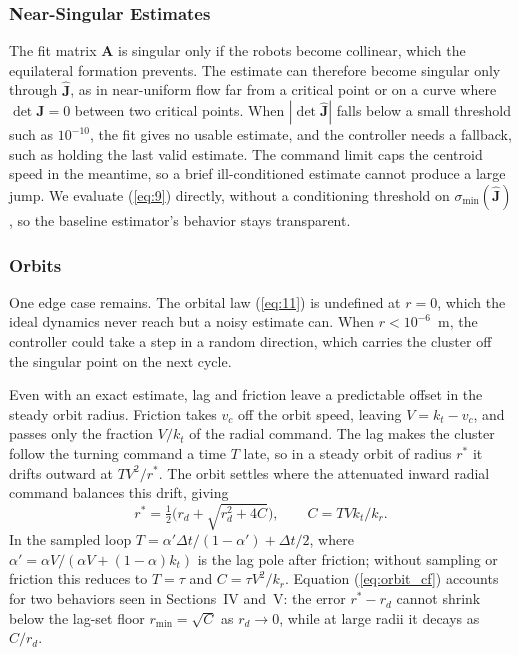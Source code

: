 \documentclass[lettersize,journal]{IEEEtran}
\begin{document}
\subsubsection{Near-Singular Estimates}
The fit matrix $\mathbf{A}$ is singular only if the robots become collinear, which the equilateral formation prevents. The estimate can therefore become singular only through $\hat{\mathbf{J}}$, as in near-uniform flow far from a critical point or on a curve where $\det\mathbf{J} = 0$ between two critical points. When $|\det\hat{\mathbf{J}}|$ falls below a small threshold such as $10^{-10}$, the fit gives no usable estimate, and the controller needs a fallback, such as holding the last valid estimate.
The command limit caps the centroid speed in the meantime, so a brief ill-conditioned estimate cannot produce a large jump. We evaluate (\ref{eq:9}) directly, without a conditioning threshold on $\sigma_{\min}(\hat{\mathbf{J}})$, so the baseline estimator's behavior stays transparent.

\subsubsection{Orbits}
One edge case remains. The orbital law (\ref{eq:11}) is undefined at $r = 0$, which the ideal dynamics never reach but a noisy estimate can. When $r < 10^{-6}$~m, the controller could take a step in a random direction, which carries the cluster off the singular point on the next cycle.

Even with an exact estimate, lag and friction leave a predictable offset in the steady orbit radius. Friction takes $v_c$ off the orbit speed, leaving $V = k_t - v_c$, and passes only the fraction $V/k_t$ of the radial command. The lag makes the cluster follow the turning command a time $T$ late, so in a steady orbit of radius $r^*$ it drifts outward at $TV^2/r^*$. The orbit settles where the attenuated inward radial command balances this drift, giving
\begin{equation}\label{eq:orbit_cf}
r^* = \tfrac{1}{2}\bigl(r_d + \sqrt{r_d^2 + 4C}\bigr), \qquad C = TVk_t/k_r.
\end{equation}
In the sampled loop $T = \alpha'\Delta t/(1-\alpha') + \Delta t/2$, where $\alpha' = \alpha V/(\alpha V + (1-\alpha)k_t)$ is the lag pole after friction; without sampling or friction this reduces to $T = \tau$ and $C = \tau V^2/k_r$. Equation (\ref{eq:orbit_cf}) accounts for two behaviors seen in Sections~IV and~V: the error $r^* - r_d$ cannot shrink below the lag-set floor $r_{\min} = \sqrt{C}$ as $r_d \to 0$, while at large radii it decays as $C/r_d$.
\end{document}

